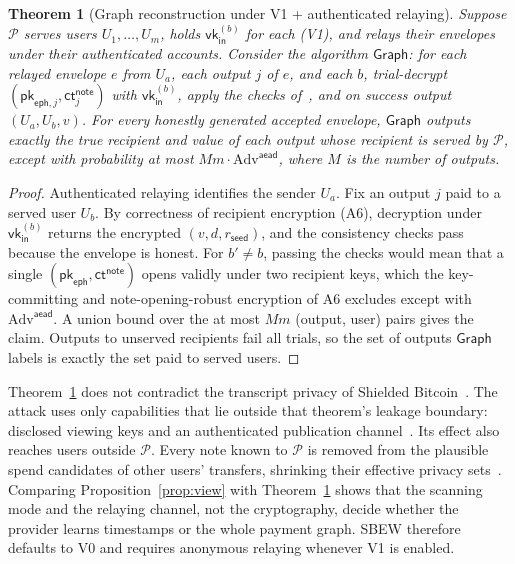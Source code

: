 \documentclass[11pt]{article}
\newtheorem{theorem}{Theorem}
\theoremstyle{remark}
\newcommand{\vk}{\mathsf{vk}}
\newcommand{\SB}{Shielded Bitcoin}
\newcommand{\sysname}{\textsf{SBEW}}
\begin{document}
\begin{theorem}[Graph reconstruction under V1 + authenticated relaying]
\label{prop:graph}
Suppose $\mathcal{P}$ serves users $U_1,\dots,U_m$, holds $\vk_{\mathsf{in}}^{(b)}$ for each (V1), and relays their envelopes under their authenticated accounts. Consider the algorithm $\mathsf{Graph}$: for each relayed envelope $e$ from $U_a$, each output $j$ of $e$, and each $b$, trial-decrypt $(\mathsf{pk}_{\mathsf{eph},j}, \mathsf{ct}^{\mathsf{note}}_j)$ with $\vk_{\mathsf{in}}^{(b)}$, apply the checks of~\cite[§16.1]{sb26}, and on success output $(U_a, U_b, v)$. For every honestly generated accepted envelope, $\mathsf{Graph}$ outputs exactly the true recipient and value of each output whose recipient is served by $\mathcal{P}$, except with probability at most $M m \cdot \mathrm{Adv}^{\mathsf{aead}}$, where $M$ is the number of outputs.
\end{theorem}
\begin{proof}
Authenticated relaying identifies the sender $U_a$. Fix an output $j$ paid to a served user $U_b$. By correctness of recipient encryption (A6), decryption under $\vk_{\mathsf{in}}^{(b)}$ returns the encrypted $(v,d,r_{\mathsf{seed}})$, and the consistency checks pass because the envelope is honest. For $b' \ne b$, passing the checks would mean that a single $(\mathsf{pk}_{\mathsf{eph}}, \mathsf{ct}^{\mathsf{note}})$ opens validly under two recipient keys, which the key-committing and note-opening-robust encryption of A6 excludes except with $\mathrm{Adv}^{\mathsf{aead}}$. A union bound over the at most $Mm$ (output, user) pairs gives the claim. Outputs to unserved recipients fail all trials, so the set of outputs $\mathsf{Graph}$ labels is exactly the set paid to served users.
\end{proof}

Theorem~\ref{prop:graph} does not contradict the transcript privacy of \SB{}~\cite[Thm.~2]{sb26}. The attack uses only capabilities that lie outside that theorem's leakage boundary: disclosed viewing keys and an authenticated publication channel~\cite[§20.5, §20.7]{sb26}. Its effect also reaches users outside $\mathcal{P}$. Every note known to $\mathcal{P}$ is removed from the plausible spend candidates of other users' transfers, shrinking their effective privacy sets~\cite[§20.6]{sb26}. Comparing Proposition~\ref{prop:view} with Theorem~\ref{prop:graph} shows that the scanning mode and the relaying channel, not the cryptography, decide whether the provider learns timestamps or the whole payment graph. \sysname{} therefore defaults to V0 and requires anonymous relaying whenever V1 is enabled.
\end{document}
